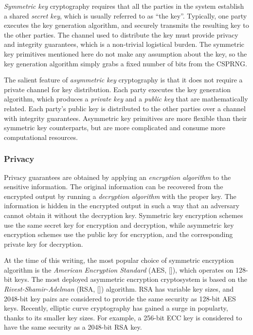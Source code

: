 \textit{Symmetric key} cryptography requires that all the parties in the system
establish a shared \textit{secret key}, which is usually referred to as ``the
key''. Typically, one party executes the key generation algorithm, and securely
transmits the resulting key to the other parties. The channel used to
distribute the key must provide privacy and integrity guarantees, which is a
non-trivial logistical burden. The symmetric key primitives mentioned here do
not make any assumption about the key, so the key generation algorithm simply
grabs a fixed number of bits from the CSPRNG.

The salient feature of \textit{asymmetric key} cryptography is that it does not
require a private channel for key distribution. Each party executes the key
generation algorithm, which produces a \textit{private key} and a
\textit{public key} that are mathematically related. Each party's public key
is distributed to the other parties over a channel with integrity guarantees.
Asymmetric key primitives are more flexible than their symmetric key
counterparts, but are more complicated and consume more computational
resources.


\subsubsection{Privacy}

Privacy guarantees are obtained by applying an \textit{encryption algorithm} to
the sensitive information. The original information can be recovered from the
encrypted output by running a \textit{decryption algorithm} with the proper
key. The information is hidden in the encrypted output in such a way that an
adversary cannot obtain it without the decryption key. Symmetric key encryption
schemes use the same secret key for encryption and decryption, while asymmetric
key encryption schemes use the public key for encryption, and the corresponding
private key for decryption.

At the time of this writing, the most popular choice of symmetric encryption
algorithm is the \textit{American Encryption Standard} (AES, []), which
operates on 128-bit keys. The most deployed asymmetric encryption cryptosystem
is based on the \textit{Rivest-Shamir-Adelman} (RSA, []) algorithm. RSA has
variable key sizes, and 2048-bit key pairs are considered to provide the same
security as 128-bit AES keys. Recently, elliptic curve cryptography has gained
a surge in popularty, thanks to its smaller key sizes. For example, a 256-bit
ECC key is considered to have the same security as a 2048-bit RSA key.



